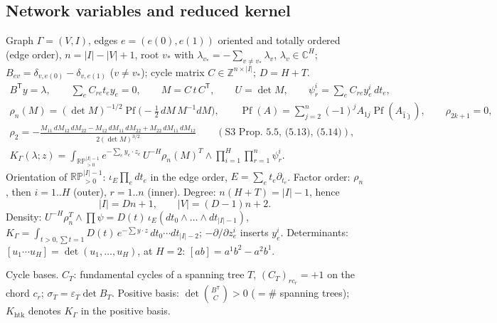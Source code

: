 \documentclass[10pt,a4paper]{article}
\numberwithin{equation}{section}
\theoremstyle{definition}
\theoremstyle{remark}
\newcommand{\RPp}[1]{\mathbb{RP}^{#1}_{>0}}
\newcommand{\Pf}{\operatorname{Pf}}
\newcommand{\htk}{\mathrm{htk}}
\begin{document}
\subsection{Network variables and reduced kernel}\label{sec-net}

Graph $\Gamma=(V,I)$, edges $e=(e(0),e(1))$ oriented and totally ordered (edge order), $n=|I|-|V|+1$, root $v_*$ with $\lambda_{v_*}=-\sum_{v\ne v_*}\lambda_v$, $\lambda_v\in\mathbb C^H$; $B_{ev}=\delta_{v,e(0)}-\delta_{v,e(1)}$ ($v\ne v_*$); cycle matrix $C\in\mathbb Z^{n\times|I|}$; $D=H+T$.
\begin{gather}
B^{\mathsf T}y=\lambda,\qquad \sum_eC_{re}t_ey_e=0,\qquad M=C\,t\,C^{\mathsf T},\qquad U=\det M,\qquad \psi^i_r=\sum_eC_{re}y^i_e\,dt_e,\\
\rho_n(M)=(\det M)^{-1/2}\Pf\big(-\tfrac12\,dM\,M^{-1}dM\big),\qquad \Pf(A)=\sum_{j=2}^n(-1)^jA_{1j}\Pf(A_{\hat1\hat\jmath}),\qquad\rho_{2k+1}=0,\label{eq-rho}\\
\rho_2=-\frac{M_{11}\,dM_{12}\,dM_{22}-M_{12}\,dM_{11}\,dM_{22}+M_{22}\,dM_{11}\,dM_{12}}{2(\det M)^{3/2}}\qquad(\text{S3 Prop.~5.5, (5.13), (5.14)}),\\
K_\Gamma(\lambda;z)=\int_{\RPp{|I|-1}}e^{-\sum_ey_e\cdot z_e}\,U^{-H}\rho_n(M)^T\wedge\prod_{i=1}^H\prod_{r=1}^n\psi^i_r .\label{eq-K}
\end{gather}
Orientation of $\RPp{|I|-1}$: $\iota_E\prod_edt_e$ in the edge order, $E=\sum_et_e\partial_{t_e}$. Factor order: $\rho_n$, then $i=1..H$ (outer), $r=1..n$ (inner). Degree: $n(H+T)=|I|-1$, hence
\begin{equation}
|I|=Dn+1,\qquad |V|=(D-1)n+2 .
\end{equation}
Density: $U^{-H}\rho_n^T\wedge\prod\psi=D(t)\,\iota_E(dt_0\wedge\dots\wedge dt_{|I|-1})$, $K_\Gamma=\int_{t>0,\sum t=1}D(t)\,e^{-\sum y\cdot z}\,dt_0\cdots dt_{|I|-2}$; $-\partial/\partial z^i_e$ inserts $y^i_e$. Determinants: $[u_1\cdots u_H]=\det(u_1,\dots,u_H)$, at $H=2$: $[ab]=a^1b^2-a^2b^1$.

Cycle bases. $C_T$: fundamental cycles of a spanning tree $T$, $(C_T)_{rc_r}=+1$ on the chord $c_r$; $\sigma_T=\varepsilon_T\det B_T$. Positive basis: $\det\binom{B^{\mathsf T}}{C}>0$ ($=\#$ spanning trees); $K_\htk$ denotes $K_\Gamma$ in the positive basis.
\end{document}
